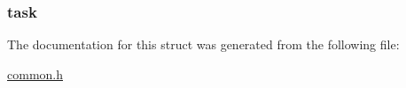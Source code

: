\subsubsection[{\texorpdfstring{task}{task}}]{ task}\hypertarget{struct_task___collection_a8bcc572b9d73774627be66dd46aa61a8}{}\label{struct_task___collection_a8bcc572b9d73774627be66dd46aa61a8}


The documentation for this struct was generated from the following file\+:\begin{DoxyCompactItemize}
\item 
\hyperlink{common_8h}{common.\+h}\end{DoxyCompactItemize}
